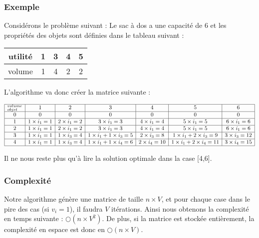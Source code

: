 \subsubsection{Exemple}

Considérons le problème suivant :
Le sac à dos a une capacité de 6 et les propriétés des objets sont définies dans le tableau suivant
:
\begin{center}
\begin{tabular}{|c|c|c|c|c|} \hline
	utilité & 1 & 3 & 4 & 5 \\ \hline
	volume & 1 & 4 & 2 & 2 \\ \hline
\end{tabular}
\end{center}

L'algorithme va donc créer la matrice suivante :
\begin{center}
$$\begin{array}{|c|c|c|c|c|c|c|} \hline
  _{objet}^{volume} & 1 & 2 & 3 & 4 & 5 & 6 \\ \hline
	0		  & 0 & 0 & 0 & 0 & 0 & 0 \\ \hline
	1			& 1 \times i_1 = 1 & 2 \times i_1 = 2 & 3 \times i_1 = 3 & 4 \times i_1 = 4 & 5 \times i_1 = 5 & 6 \times i_1 = 6 \\ \hline
	2			& 1 \times i_1 = 1 & 2 \times i_1 = 2 & 3 \times i_1 = 3 & 4 \times i_1 = 4 & 5 \times i_1 = 5 & 6 \times i_1 = 6 \\ \hline
	3			& 1 \times i_1 = 1 & 1 \times i_3 = 4 & 1 \times i_1 + 1 \times i_3 = 5 & 2 \times i_3 = 8 & 1 \times i_1 + 2 \times i_3 = 9 & 3 \times i_3 = 12 \\ \hline
	4			& 1 \times i_1 = 1 & 1 \times i_3 = 4 & 1 \times i_1 + 1 \times i_4 = 6 & 2 \times i_4 = 10
	& 1 \times i_1 + 2 \times i_4 = 11  & 3 \times i_4 = 15 \\ \hline
\end{array}$$
\end{center}

Il ne nous reste plus qu'à lire la solution optimale dans la case [4,6].


\subsubsection{Complexité}
Notre algorithme génère une matrice de taille $n \times V$, et pour chaque case dans le pire des cas (si $v_i = 1$), il faudra $V$ 
itérations. Ainsi nous obtenons la complexité en temps suivante : $\bigcirc(n\times V^2)$.
De plus, si la matrice est stockée entièrement, la complexité en espace est donc en $\bigcirc(n\times V)$.

